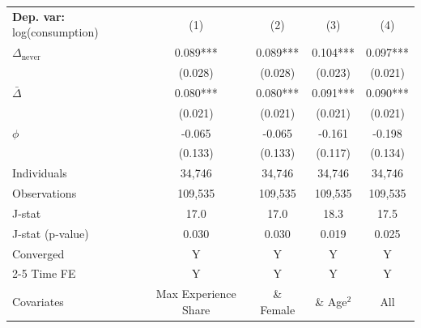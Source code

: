 \begin{tabular}{l cccc} \toprule  \textbf{Dep. var:}  log(consumption) 
                    &\multicolumn{1}{c}{(1)}   &\multicolumn{1}{c}{(2)}   &\multicolumn{1}{c}{(3)}   &\multicolumn{1}{c}{(4)}   \\

\addlinespace
$\Delta_{\text{never}}$&       0.089***&       0.089***&       0.104***&       0.097***\\
                    &     (0.028)   &     (0.028)   &     (0.023)   &     (0.021)   \\

\addlinespace
$\bar{\Delta}$      &       0.080***&       0.080***&       0.091***&       0.090***\\
                    &     (0.021)   &     (0.021)   &     (0.021)   &     (0.021)   \\

\addlinespace
$\phi$              &      -0.065   &      -0.065   &      -0.161   &      -0.198   \\
                    &     (0.133)   &     (0.133)   &     (0.117)   &     (0.134)   \\
\addlinespace
Individuals         &      34,746   &      34,746   &      34,746   &      34,746   \\
Observations        &     109,535   &     109,535   &     109,535   &     109,535   \\
J-stat              &        17.0   &        17.0   &        18.3   &        17.5   \\
J-stat (p-value)    &       0.030   &       0.030   &       0.019   &       0.025   \\
Converged           &           Y   &           Y   &           Y   &           Y   \\
\cmidrule{2-5} Time FE & Y & Y & Y & Y \\ Covariates & Max Experience Share & \& Female & \& Age$^2$ & All \\ \bottomrule \end{tabular}
